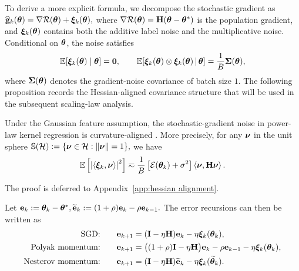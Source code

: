 \documentclass[11pt]{article}
\begin{document}
To derive a more explicit formula, we decompose the stochastic gradient as \(
\widehat{\mathbf{g}}_k(\bm{\theta})
=
\nabla\mathcal{R}(\bm{\theta})+\bm{\xi}_k(\bm{\theta}),
\)
where \(\nabla\mathcal{R}(\bm{\theta})=\mathbf{H}(\bm{\theta}-\bm{\theta}^*)\) is the population gradient, and \(\bm{\xi}_k(\bm{\theta})\) contains both the additive label noise and the multiplicative noise.
Conditional on \(\bm{\theta}\), the noise satisfies
\[
\mathbb{E}[\bm{\xi}_k(\bm{\theta})\mid\bm{\theta}]=\bm 0,
\qquad
\mathbb{E}\!\left[
\bm{\xi}_k(\bm{\theta})\otimes\bm{\xi}_k(\bm{\theta})
\,\middle|\,\bm{\theta}
\right]
=
\frac{1}{B}\boldsymbol{\Sigma}(\bm{\theta}),
\]
where \(\boldsymbol{\Sigma}(\bm{\theta})\) denotes the gradient-noise covariance of batch size \(1\). The following proposition records the Hessian-aligned covariance structure that will be used in the subsequent scaling-law analysis.
\begin{proposition}
\label{prop:noise-geometry}
Under the Gaussian feature assumption, the stochastic-gradient noise
in power-law kernel regression is curvature-aligned  \citep{wang2023theoretical}. More precisely, for any $\bm{\nu}$ in the unit sphere
\(
\mathbb S(\mathcal H)
:=
\{\bm{\nu}\in\mathcal H:\|\bm{\nu}\|=1\},
\)
we have
\begin{equation}
\label{eqn:noise-geometry}
\mathbb{E}\left[
    \left|
    \left\langle \bm{\xi}_k,\bm{\nu}\right\rangle
    \right|^2
\right]
\eqsim
\frac{1}{B}
\left[\mathcal{E}(\bm{\theta}_k)+\sigma^2\right]
\left\langle\bm{\nu},\mathbf{H}\bm{\nu}\right\rangle.
\end{equation}
\end{proposition}

The proof is deferred to Appendix~\ref{app:hessian alignment}.

Let
\(
\mathrm{\mathbf{e}}_k:=\bm{\theta}_k-\bm{\theta}^*,
\widetilde{\mathrm{\mathbf{e}}}_k
:=
(1+\rho)\mathrm{\mathbf{e}}_k-\rho\mathrm{\mathbf{e}}_{k-1}.
\)
The error recursions can then be written as
\begin{align}
\textnormal{SGD:}&\qquad
\mathrm{\mathbf{e}}_{k+1}
=
(\mathbf{I}-\eta\mathbf{H})\mathrm{\mathbf{e}}_k
-\eta\bm{\xi}_k(\bm{\theta}_k),
\label{eq:sgd-error-update}
\\
\textnormal{Polyak momentum:}&\qquad
\mathrm{\mathbf{e}}_{k+1}
=
\bigl((1+\rho)\mathbf{I}-\eta\mathbf{H}\bigr)\mathrm{\mathbf{e}}_k
-\rho\mathrm{\mathbf{e}}_{k-1}
-\eta\bm{\xi}_k(\bm{\theta}_k),
\label{eq:hb-error-update}
\\
\textnormal{Nesterov momentum:}&\qquad
\mathrm{\mathbf{e}}_{k+1}
=
(\mathbf{I}-\eta\mathbf{H})\widetilde{\mathrm{\mathbf{e}}}_k
-\eta\bm{\xi}_k(\widetilde{\bm{\theta}}_k).
\label{eq:nag-error-update}
\end{align}
\end{document}
